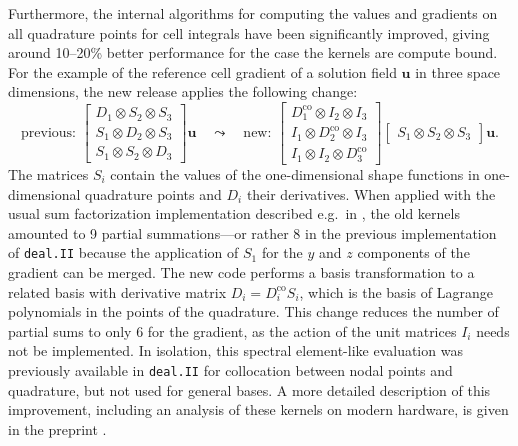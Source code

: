 \documentclass{ansarticle-preprint}
\newcommand{\specialword}[1]{\texttt{#1}}
\newcommand{\dealii}{{\specialword{deal.II}}\xspace}
\begin{document}
Furthermore, the internal algorithms for computing the values and gradients on
all quadrature points for cell integrals have been significantly improved,
giving around 10--20\% better performance for the case the kernels are compute
bound. For the example of the reference cell gradient of a solution field
$\mathbf u$ in three space dimensions, the new release applies the following
change:
\begin{equation*}
  \text{previous: }
  \begin{bmatrix}
    D_{1} \otimes S_{2} \otimes S_{3}\\
    S_{1} \otimes D_{2} \otimes S_{3}\\
    S_{1} \otimes S_{2} \otimes D_{3}
  \end{bmatrix}
  \mathbf u
  \quad
  \leadsto
  \quad
  \text{new: }
  \begin{bmatrix}
    D_{1}^{\mathrm{co}} \otimes I_{2} \otimes I_{3}\\
    I_{1} \otimes D_{2}^{\mathrm{co}} \otimes I_{3}\\
    I_{1} \otimes I_{2} \otimes D_{3}^{\mathrm{co}}
  \end{bmatrix}
  \begin{bmatrix}
    S_{1} \otimes S_{2} \otimes S_{3}
  \end{bmatrix}
  \mathbf u.
\end{equation*}
The matrices $S_i$ contain the values of the one-dimensional shape functions
in one-dimensional quadrature points and $D_i$ their derivatives. When applied
with the usual sum factorization implementation described e.g.~in
\cite{KronbichlerKormann2012}, the old kernels amounted to 9 partial
summations---or rather 8 in the previous implementation of \dealii{} because
the application of $S_1$ for the $y$ and $z$ components of the gradient can be
merged. The new code performs a basis transformation to a related basis with
derivative matrix $D_i = D_i^{\mathrm{co}} S_i$, which is the basis of
Lagrange polynomials in the points of the quadrature. This change reduces the
number of partial sums to only 6 for the gradient, as the action of the unit
matrices $I_i$ needs not be implemented. In isolation, this spectral
element-like evaluation was previously available in \dealii{} for collocation
between nodal points and quadrature, but not used for general bases. A more
detailed description of this improvement, including an analysis of these
kernels on modern hardware, is given in the preprint
\cite{KronbichlerKormann2017}.


\end{document}
